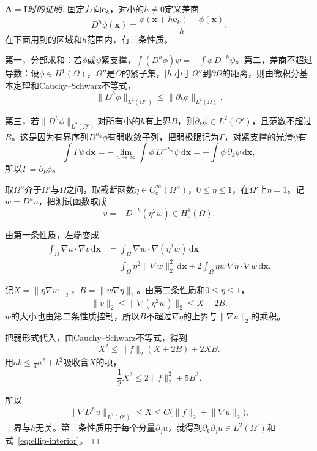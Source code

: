\begin{proof}[$\bm{A}=\bm{I}$时的证明]
固定方向$\bm{e}_k$，对小的$h\neq0$定义差商
\[
 D^h\phi(\bm{x})=\frac{\phi(\bm{x}+h\bm{e}_k)-\phi(\bm{x})}h .
\]
在下面用到的区域和$h$范围内，有三条性质。

第一，分部求和：若$\phi$或$\psi$紧支撑，$\int(D^h\phi)\psi=-\int\phi\,D^{-h}\psi$。第二，差商不超过导数：设$\phi\in H^1(\Omega)$，$\overline{\Omega''}$是$\Omega$的紧子集，$\lvert h\rvert$小于$\Omega''$到$\partial\Omega$的距离，则由微积分基本定理和Cauchy--Schwarz不等式，
\[
 \lVert D^h\phi\rVert_{L^2(\Omega'')}\leq\lVert\partial_k\phi\rVert_{L^2(\Omega)} .
\]

第三，若$\lVert D^h\phi\rVert_{L^2(\Omega')}$对所有小的$h$有上界$B$，则$\partial_k\phi\in L^2(\Omega')$，且范数不超过$B$。这是因为有界序列$D^{h_n}\phi$有弱收敛子列，把弱极限记为$\Gamma$，对紧支撑的光滑$\psi$有
\[
 \int\Gamma\psi\,\mathrm{d}\bm{x}=-\lim_{n\to\infty}\int\phi\,D^{-h_n}\psi\,\mathrm{d}\bm{x}=-\int\phi\,\partial_k\psi\,\mathrm{d}\bm{x},
\]
所以$\Gamma=\partial_k\phi$。

取$\Omega''$介于$\Omega'$与$\Omega$之间，取截断函数$\eta\in C_c^\infty(\Omega'')$，$0\leq\eta\leq1$，在$\Omega'$上$\eta=1$。记$w=D^hu$，把测试函数取成
\[
 v=-D^{-h}(\eta^2w)\in H^1_0(\Omega) .
\]

由第一条性质，左端变成
\[
 \begin{aligned}
 \int_\Omega\nabla u\cdot\nabla v\,\mathrm{d}\bm{x}&=\int_\Omega\nabla w\cdot\nabla(\eta^2w)\,\mathrm{d}\bm{x}\\
 &=\int_\Omega\eta^2\lVert\nabla w\rVert_2^2\,\mathrm{d}\bm{x}+2\int_\Omega\eta w\,\nabla\eta\cdot\nabla w\,\mathrm{d}\bm{x}.
 \end{aligned}
\]

记$X=\lVert\eta\nabla w\rVert_2$，$B=\lVert w\nabla\eta\rVert_2$。由第二条性质和$0\leq\eta\leq1$，
\[
 \lVert v\rVert_2\leq\lVert\nabla(\eta^2w)\rVert_2\leq X+2B .
\]
$w$的大小也由第二条性质控制，所以$B$不超过$\nabla\eta$的上界与$\lVert\nabla u\rVert_2$的乘积。

把弱形式代入，由Cauchy--Schwarz不等式，得到
\[
 X^2\leq\lVert f\rVert_2(X+2B)+2XB .
\]
用$ab\leq\tfrac14a^2+b^2$吸收含$X$的项，
\[
 \frac12X^2\leq2\lVert f\rVert_2^2+5B^2 .
\]

所以
\[
 \lVert\nabla D^hu\rVert_{L^2(\Omega')}\leq X\leq C\bigl(\lVert f\rVert_2+\lVert\nabla u\rVert_2\bigr),
\]
上界与$h$无关。第三条性质用于每个分量$\partial_ju$，就得到$\partial_k\partial_ju\in L^2(\Omega')$和式~\eqref{eq:ellip-interior}。
\end{proof}

